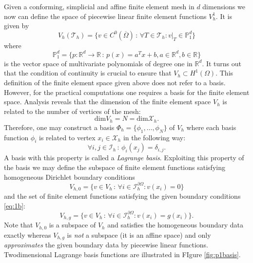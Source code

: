 \documentclass[a4paper,
		     11pt,
		     DIV12,
		     DIVcalc,
		     headings=normal,
		     oneside,
		     bibliography=totoc,
		     headsepline=false,
		     headinclude]{scrartcl}
\begin{document}
Given a conforming, simplicial and affine finite element mesh in $d$ dimensions we
now can define the space of piecewise linear finite element functions $V_h^1$.
It is given by
\begin{equation}
V_h(\mathcal{T}_h) = \{ v\in C^0(\overline{\Omega}) \,:\, 
\forall T\in\mathcal{T}_h : v|_T\in\mathbb{P}_1^d\}
\label{eq:Vh}
\end{equation}
where $$\mathbb{P}_1^d = \{ p : \mathbb{R}^d \to \mathbb{R}
\,:\, p(x) = a^Tx+ b, a\in\mathbb{R}^d, b\in\mathbb{R}\}$$
is the vector space of multivariate polynomials of degree one in $\mathbb{R}^d$.
It turns out that the condition of continuity is crucial to ensure that $V_h\subset H^1(\Omega)$.
This definition of the finite element space given above does not refer to a basis.
However, for the practical computations one requires a basis for the
finite element space. Analysis reveals that the dimension of the finite element
space $V_h$ is related to the number of vertices of the mesh:
$$\text{dim} V_h = N = \text{dim} \mathcal{X}_h.$$
Therefore, one may construct a basis $\Phi_h=\{\phi_1,\ldots,\phi_N\}$ of $V_h$ 
where each basis function $\phi_i$ is related to vertex $x_i\in\mathcal{X}_h$ in the following way:
\begin{equation*}
\forall i,j\in\mathcal{I}_h \,:\, \phi_i(x_j) = \delta_{i,j}. 
\end{equation*}
A basis with this property is called a {\em Lagrange basis}.
Exploiting this property of the basis we may define the subspace of
finite element functions satisfying homogeneous Dirichlet boundary conditions
\begin{equation*}
V_{h,0} = \{v\in V_h \,:\, \forall i\in\mathcal{I}_h^{\partial\Omega} : v(x_i)=0\}
\end{equation*}
and the set of finite element functions satisfying the
given boundary conditions \eqref{eq:1b}:
\begin{equation*}
V_{h,g} = \{v\in V_h \,:\, \forall i\in\mathcal{I}_h^{\partial\Omega} : v(x_i)=g(x_i)\}.
\end{equation*}
Note that $V_{h,0}$ is a subspace of $V_h$ and satisfies the homogeneous
boundary data exactly whereas $V_{h,g}$ is {\em not} a subspace (it is an affine space)
and only {\em approximates} the given boundary data by piecewise linear functions.
Twodimensional Lagrange basis functions are illustrated in FIgure \ref{fig:p1basis}.
\end{document}
